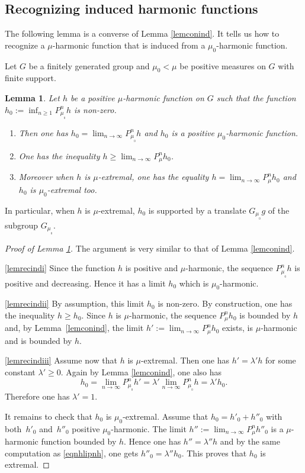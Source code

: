 \documentclass[JEP,XML,SOM,Unicode]{cedram}
\newenvironment{enumeratei}
{\bgroup\def\theenumi{\roman{enumi}}\def\theenumii{\arabic{enumii}}\begin{enumerate}}
{\end{enumerate}\egroup}
\newtheorem{Lem}[Thm]{Lemma}
\theoremstyle{definition}
\let\la\lambda
\let\bq\relax
\let\eq\relax
\let\ra\to
\begin{document}
\subsection{Recognizing induced harmonic functions}
\label{secrecind}

\bq
The following lemma is a converse of Lemma \ref{lemconind}.
It tells us how to recognize
a $\mu$-harmonic function that is induced from a $\mu_0$-harmonic function.
\eq

Let $G$ be a finitely generated group and
$\mu_0<\mu$ be positive measures on $G$ with finite support.

\begin{Lem}
\label{lemrecind}
Let $h$ be a positive $\mu$-harmonic function on $G$ such that
the function $h_0:=\inf_{n\geq 1}P^n_{\mu_{_0}}h$ is non-zero.
\begin{enumeratei}
\item\label{lemrecindi}
Then
one has
$h_0=\lim_{n\ra\infty}P^n_{\mu_{_0}}h$ and
$h_0$ is a positive $\mu_0$-harmonic function.
\item\label{lemrecindii}
One has the inequality
$h\geq\lim_{n\ra\infty}P^n_{\mu}h_0$.
\item\label{lemrecindiii}
Moreover when $h$ is $\mu$-extremal, one has the equality
$h=\lim_{n\ra\infty}P^n_{\mu}h_0$ and~$h_0$ is $\mu_0$-extremal too.
\end{enumeratei}
\end{Lem}

In particular, when $h$ is $\mu$-extremal, $h_0$ is supported by a translate
$G_{\mu_{_0}}g$ of the subgroup $G_{\mu_{_0}}$.

\begin{proof}[Proof of Lemma \ref{lemrecind}]
The argument is very similar to that of Lemma \ref{lemconind}.

\eqref{lemrecindi}
Since the function $h$ is positive and $\mu$-harmonic, the sequence
$P^n_{\mu_{_0}}h$ is positive and decreasing. Hence it has a limit $h_0$
which is $\mu_0$-harmonic.

\eqref{lemrecindii}
By assumption, this limit $h_0$ is non-zero. By construction,
one has the inequality
$h\geq h_0$. Since $h$ is $\mu$-harmonic, the sequence
$ P^n_{\mu}h_0$ is bounded by $h$ and, by Lemma~\ref{lemconind},
the limit $h':=\lim_{n\ra\infty}P^n_\mu h_0$
exists, is $\mu$-harmonic and is bounded by $h$.

\eqref{lemrecindiii}
Assume now that $h$ is $\mu$-extremal.
Then one has $h'=\la' h$ for some constant $\la'\geq 0$.
Again by Lemma \ref{lemconind}, one also has
\begin{equation}
\label{eqnhlipnh}
h_0=\lim_{n\ra\infty}P^n_{\mu_{_0}}h'
=\la'\lim_{n\ra\infty}P^n_{\mu_{_0}}h=\la' h_0.
\end{equation}
Therefore one has $\la'=1$.

It remains to check that $h_0$ is $\mu_0$-extremal.
Assume that $h_0=h'_0+h''_0$ with both~$h'_0$ and~$h''_0$
positive $\mu_0$-harmonic.
The limit
$h'':=\lim_{n\ra\infty}P^n_{\mu}h''_0$
is a $\mu$-harmonic function bounded by $h$.
Hence one has $h''=\la'' h$
and by the same computation as \eqref{eqnhlipnh}, one gets
$h''_0=\la'' h_0$.
This proves that $h_0$ is extremal.
\end{proof}
\end{document}
